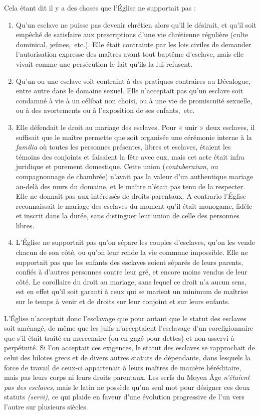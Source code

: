  Cela étant dit il y a des choses que l'Église ne supportait pas :
\begin{enumerate}
\item Qu'un esclave ne puisse pas devenir chrétien alors qu'il le désirait, et qu'il soit empêché de satisfaire aux prescriptions d'une vie chrétienne régulière (culte dominical, jeûnes,~etc.). Elle était contrainte par les lois civiles de demander l'autorisation expresse des maîtres avant tout baptême d'esclave, mais elle vivait comme une persécution le fait qu'ils la lui refusent.
\item Qu'un ou une esclave soit contraint à des pratiques contraires au Décalogue, entre autre dans le domaine sexuel. Elle n'acceptait pas qu'un esclave soit condamné à vie à un célibat non choisi, ou à une vie de promiscuité sexuelle, ou à des avortements ou à l'exposition de ses enfants,~etc.
\item Elle défendait le droit au mariage des esclaves. Pour « unir » deux esclaves, il suffisait que le maître permette que soit organisée une cérémonie interne à la \emph{familia} où toutes les personnes présentes, libres et esclaves, étaient les témoins des conjoints et faisaient la fête avec eux, mais cet acte était infra juridique et purement domestique. Cette union (\emph{contubernium}, ou compagnonnage de chambrée) n'avait pas la valeur d'un authentique mariage au-delà des murs du domaine, et le maître n'était pas tenu de la respecter. Elle ne donnait pas aux intéressés de droits parentaux. A contrario l'Église reconnaissait le mariage des esclaves du moment qu'il était monogame, fidèle et inscrit dans la durée, sans distinguer leur union de celle des personnes libres.
\item L'Église ne supportait pas qu'on sépare les couples d'esclaves, qu'on les vende chacun de son côté, ou qu'on leur rende la vie commune impossible. Elle ne supportait pas que les enfants des esclaves soient séparés de leurs parents, confiés à d'autres personnes contre leur gré, et encore moins vendus de leur côté. Le corollaire du droit au mariage, sans lequel ce droit n'a aucun sens, est en effet qu'il soit garanti à ceux qui se marient un minimum de maîtrise sur le temps à venir et de droits sur leur conjoint et sur leurs enfants. 
\end{enumerate}

 L'Église n'acceptait donc l'esclavage que pour autant que le statut des esclaves soit aménagé, de même que les juifs n'acceptaient l'esclavage d'un coreligionnaire que s'il était traité en mercenaire (ou en gagé pour dettes) et non asservi à perpétuité. Si l'on acceptait ces exigences, le statut des esclaves se rapprochait de celui des hilotes grecs et de divers autres statuts de dépendants, dans lesquels la force de travail de ceux-ci appartenait à leurs maîtres de manière héréditaire, mais pas leurs corps ni leurs droits parentaux. Les serfs du Moyen Âge \emph{n'étaient pas des esclaves}, mais le latin ne possède qu'un seul mot pour désigner ces deux statuts \emph{(servi)}, ce qui plaide en faveur d'une évolution progressive de l'un vers l'autre sur plusieurs siècles.

